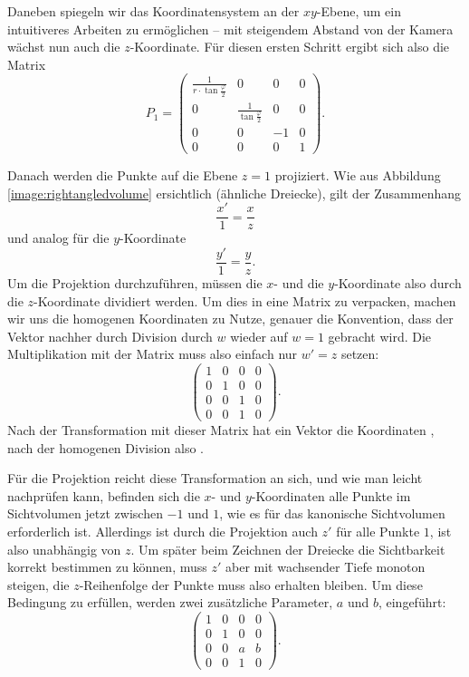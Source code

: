 Daneben spiegeln wir das Koordinatensystem an der $xy$-Ebene, um ein intuitiveres Arbeiten zu ermöglichen -- mit steigendem Abstand von der Kamera wächst nun auch die $z$-Koordinate. Für diesen ersten Schritt ergibt sich also die Matrix
\begin{equation}
 P_1 = \begin{pmatrix}
  \frac{1}{r \cdot \tan\frac{\varphi}{2}} & 0 & 0 & 0 \\
  0 & \frac{1}{\tan\frac{\varphi}{2}} & 0 & 0 \\
  0 & 0 & -1 & 0 \\
  0 & 0 & 0 & 1
 \end{pmatrix}.
\end{equation}

Danach werden die Punkte auf die Ebene $z=1$ projiziert. Wie aus Abbildung \ref{image:rightangledvolume} ersichtlich (ähnliche Dreiecke), gilt der Zusammenhang
\begin{equation}
 \frac{x'}{1} = \frac{x}{z}
\end{equation}
und analog für die $y$-Koordinate
\begin{equation}
 \frac{y'}{1} = \frac{y}{z}.
\end{equation}
Um die Projektion durchzuführen, müssen die $x$- und die $y$-Koordinate also durch die $z$-Koordinate dividiert werden. Um dies in eine Matrix zu verpacken, machen wir uns die homogenen Koordinaten zu Nutze, genauer die Konvention, dass der Vektor nachher durch Division durch $w$ wieder auf $w=1$ gebracht wird. Die Multiplikation mit der Matrix muss also einfach nur $w' = z$ setzen:
\begin{equation}
 \begin{pmatrix}
  1 & 0 & 0 & 0 \\
  0 & 1 & 0 & 0 \\
  0 & 0 & 1 & 0 \\
  0 & 0 & 1 & 0
 \end{pmatrix}.
\end{equation}
Nach der Transformation mit dieser Matrix hat ein Vektor die Koordinaten , nach der homogenen Division also .

Für die Projektion reicht diese Transformation an sich, und wie man leicht nachprüfen kann, befinden sich die $x$- und $y$-Koordinaten alle Punkte im Sichtvolumen jetzt zwischen $-1$ und $1$, wie es für das kanonische Sichtvolumen erforderlich ist. Allerdings ist durch die Projektion auch $z'$ für alle Punkte $1$, ist also unabhängig von $z$. Um später beim Zeichnen der Dreiecke die Sichtbarkeit korrekt bestimmen zu können, muss $z'$ aber mit wachsender Tiefe monoton steigen, die $z$-Reihenfolge der Punkte muss also erhalten bleiben. Um diese Bedingung zu erfüllen, werden zwei zusätzliche Parameter, $a$ und $b$, eingeführt:
\begin{equation}
 \begin{pmatrix}
  1 & 0 & 0 & 0 \\
  0 & 1 & 0 & 0 \\
  0 & 0 & a & b \\
  0 & 0 & 1 & 0
 \end{pmatrix}.
\end{equation}

